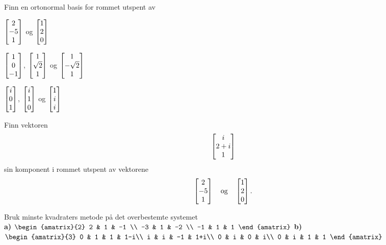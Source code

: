 \begin{oppgave}
Finn en ortonormal basis for rommet utspent av \\[2pt]

\begin{punkt}
$\begin{bmatrix} 2 \\ -5 \\ 1 \end{bmatrix}$ og $\begin{bmatrix} 1 \\ 2 \\ 0 \end{bmatrix}$ \\[4pt]
\end{punkt}

\begin{punkt}
$\begin{bmatrix} 1 \\ 0 \\ -1 \end{bmatrix}$, $\begin{bmatrix} 1 \\ \sqrt{2} \\ 1 \end{bmatrix}$ og $\begin{bmatrix} 1 \\ -\sqrt{2} \\ 1 \end{bmatrix}$\\[4pt]
\end{punkt}

\begin{punkt}
$\begin{bmatrix} i \\ 0 \\ 1 \end{bmatrix}$, $\begin{bmatrix} i \\ 1 \\ 0 \end{bmatrix}$ og $\begin{bmatrix} 1 \\ i \\ i \end{bmatrix}$\\[4pt]
\end{punkt}

\end{oppgave}

\begin{oppgave}
Finn vektoren 
\[
\begin{bmatrix} i \\ 2+i \\ 1 \end{bmatrix}
\]
sin komponent i rommet utspent av vektorene 
\[
\begin{bmatrix} 2 \\ -5 \\ 1 \end{bmatrix}\quad  \text{og} \quad \begin{bmatrix} 1 \\ 2 \\ 0 \end{bmatrix}.
\]
\end{oppgave}

\begin{oppgave}
Bruk minste kvadraters metode på det overbestemte systemet \\
\textbf{a)}
$
\begin{amatrix}{2}
2 & 1 & -1 \\
-3 & 1 & -2 \\
 -1 & 1  & 1
\end{amatrix}
$
\hfill\textbf{b)}
$
\begin{amatrix}{3}
0 & 1 & 1  & 1-i\\
i & i & -1 & 1+i\\
 0 & i  & 0 & i\\
  0 & i  & 1 & 1
\end{amatrix}
$
\end{oppgave}

